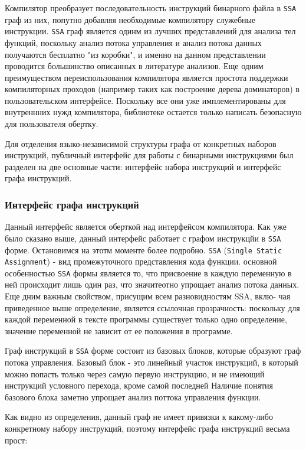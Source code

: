 Компилятор преобразует последовательность инструкций бинарного файла в \texttt{SSA} граф из них, попутно добавляя необходимые компилятору служебные инструкции. \texttt{SSA} граф является одинм из лучших представлений для анализа тел функций, поскольку анализ потока управления и анализ потока данных получаются бесплатно "из коробки", и именно на данном представлении проводится большинство описанных в литературе анализов. Еще одним преимуществом переиспользования компилятора является простота поддержки компиляторных проходов (например таких как построение дерева доминаторов) в пользовательском интерфейсе. Поскольку все они уже имплементированы для внутреннних нужд компилятора, библиотеке остается только написать безопасную для пользователя обертку.

Для отделения языко-независимой структуры графа от конкретных наборов инструкций, публичный интерфейс для работы с бинарными инструкциями был разделен на две основные части: интерфейс набора инструкций и интерфейс графа инструкций.

\subsubsection{Интерфейс графа инструкций}

Данный интерфейс является оберткой над интерфейсом компилятора. Как уже было сказано выше, данный интерфейс работает с графом инструкцйи в \texttt{SSA} форме. Остановимся на этотм моменте более подробно. \texttt{SSA} (\texttt{Single Static Assignment}) - вид промежуточного представления кода функции. основной особенностью \texttt{SSA} формы является то, что присвоение в каждую переменную в ней происходит лишь один раз, что значитеотно упрощает анализ потока данных. Еще дним важным свойством, присущим всем разновидностям SSA, вклю-
чая приведенное выше определение, является ссылочная прозрачность: поскольку для каждой переменной в тексте программы существует только одно определение, значение переменной не зависит от ее положения в программе.

Граф инструкций в \texttt{SSA} форме состоит из базовых блоков, которые образуют граф потока управления. Базовый блок - это линейный участок инструкций, в который можно попасть только через самую первую инструкцию, и не имеющий инструкций условного перехода, кроме самой последней Наличие понятия базового блока заметно упрощает анализ поттока управления функции.

Как видно из определения, данный граф не имеет привязки к какому-либо конкретному набору инструкций, поэтому интерфейс графа инструкций весьма прост:

